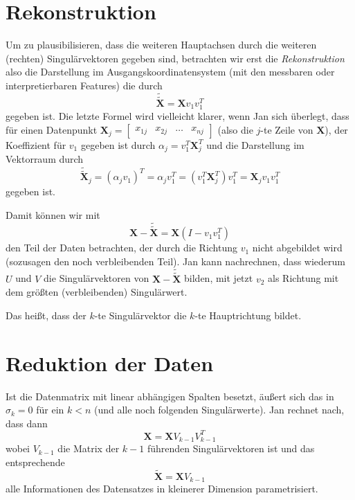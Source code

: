 \documentclass[]{book}
\theoremstyle{definition}
\theoremstyle{definition}
\theoremstyle{definition}
\theoremstyle{definition}
\theoremstyle{remark}
\begin{document}
\hypertarget{rekonstruktion}{%
\section{Rekonstruktion}\label{rekonstruktion}}

Um zu plausibilisieren, dass die weiteren Hauptachsen durch die weiteren (rechten) Singulärvektoren gegeben sind, betrachten wir erst die \emph{Rekonstruktion}
also die Darstellung im Ausgangskoordinatensystem (mit den messbaren oder interpretierbaren Features) die durch
\begin{equation*}
\tilde {\tilde {\mathbf{X}}} = {\mathbf{X}}v_1v_1^T
\end{equation*}
gegeben ist.
Die letzte Formel wird vielleicht klarer, wenn Jan sich überlegt, dass für einen Datenpunkt \({\mathbf{X}}_j=\begin{bmatrix} x_{1j} &x_{2j} & \dots& x_{nj}\end{bmatrix}\) (also die \(j\)-te Zeile von \({\mathbf{X}}\)), der Koeffizient für \(v_1\) gegeben ist durch \(\alpha_j=v_1^T{\mathbf{X}}_j^T\) und die Darstellung im Vektorraum durch
\begin{equation*}
\tilde{\tilde{ {\mathbf{X}}}}_j=(\alpha_j v_1)^T = \alpha_j v_1^T = (v_1^T {\mathbf{X}}_j^T) v_1^T  = {\mathbf{X}}_j  v_1 v_1^T
\end{equation*}
gegeben ist.

Damit können wir mit
\begin{equation*}
{\mathbf{X}}- \tilde{\tilde {{\mathbf{X}}}} = {\mathbf{X}}(I-v_1v_1^T)
\end{equation*}
den Teil der Daten betrachten, der durch die Richtung \(v_1\) nicht abgebildet wird (sozusagen den noch verbleibenden Teil). Jan kann nachrechnen, dass wiederum \(U\) und \(V\) die Singulärvektoren von \({\mathbf{X}}-\tilde{\tilde {{\mathbf{X}}}}\) bilden, mit jetzt \(v_2\) als Richtung mit dem größten (verbleibenden) Singulärwert.

Das heißt, dass der \(k\)-te Singulärvektor die \(k\)-te Hauptrichtung bildet.

\hypertarget{reduktion-der-daten}{%
\section{Reduktion der Daten}\label{reduktion-der-daten}}

Ist die Datenmatrix mit linear abhängigen Spalten besetzt, äußert sich das in \(\sigma_k = 0\) für ein \(k<n\) (und alle noch folgenden Singulärwerte). Jan rechnet nach, dass dann
\begin{equation*}
{\mathbf{X}}= {\mathbf{X}}V_{k-1}V_{k-1}^T
\end{equation*}
wobei \(V_{k-1}\) die Matrix der \(k-1\) führenden Singulärvektoren ist und das entsprechende
\begin{equation*}
\tilde {\mathbf{X}}= {\mathbf{X}}V_{k-1}
\end{equation*}
alle Informationen des Datensatzes in kleinerer Dimension parametrisiert.
\end{document}
